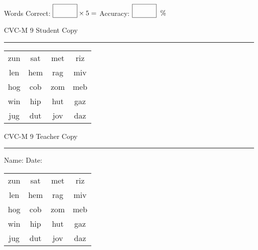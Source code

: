 \documentclass{memoir}
\begin{document}
\small

Words Correct: $\fbox{\phantom{\huge 100}} \times 5 = $ Accuracy: $\fbox{\phantom{\huge 100}}\;\; \%$ 

\vfill

\newpage


\footnotesize \noindent
CVC-M 9 \hfill Student Copy
\smallskip
\hrule

\Large

\setlength{\tabcolsep}{14pt}
\def\arraystretch{2}

{\selectfont


\begin{vplace}[0.5]
\begin{center}
\begin{tabular}{cccc}
zun & sat & met & riz \\
len & hem & rag & miv \\
hog & cob & zom & meb \\
win & hip & hut & gaz \\
jug & dut & jov & daz \\
\end{tabular}
\end{center}
\end{vplace}

}

\newpage

\footnotesize \noindent
CVC-M 9 \hfill Teacher Copy
\smallskip
\hrule

\small

\vfill

\noindent
Name: \underline{\hspace{1.75in}} \hfill Date: \underline{\hspace{1in}}

\Large

{\selectfont


\begin{vplace}[0.5]
\begin{center}
\begin{tabular}{cccc}
zun & sat & met & riz \\
len & hem & rag & miv \\
hog & cob & zom & meb \\
win & hip & hut & gaz \\
jug & dut & jov & daz \\
\end{tabular}
\end{center}
\end{vplace}



}
\end{document}
